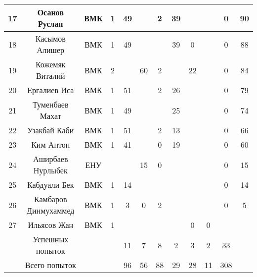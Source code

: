 \documentclass[10pt, a4paper]{article}
\begin{document}
\begin{center}
\begin{longtable}{|c|c|c|c|*{6}{c|}c|c|}
 \hline
17 & 	Осанов Руслан & 	ВМК & 1 & 	49 & 	  & 	2 & 	39 & 	  & 	  & 	0 & 	90 \\ 
 \hline
18 & 	Касымов Алишер & 	ВМК & 1 & 	49 & 	  & 	  & 	39 & 	0 & 	  & 	0 & 	88 \\ 
 \hline
19 & 	Кожемяк Виталий & 	ВМК & 2 & 	  & 	60 & 	2 & 	  & 	22 & 	  & 	0 & 	84 \\ 
 \hline
20 & 	Ергалиев Иса & 	ВМК &  1 &	51 & 	  & 	2 & 	26 & 	  & 	  & 	0 & 	79 \\ 
 \hline
21 & 	Туменбаев Махат & 	ВМК & 1 & 	49 & 	  & 	  & 	25 & 	  & 	  & 	0 & 	74 \\ 
 \hline
22 & 	Узакбай Каби & 	ВМК & 1 & 	51 & 	  & 	2 & 	13 & 	  & 	  & 	0 & 	66 \\ 
 \hline
23 & 	Ким Антон & 	ВМК & 1 & 	41 & 	  & 	0 & 	19 & 	  & 	  & 	0 & 	60 \\ 
 \hline
24 & 	Аширбаев Нурлыбек & ЕНУ  & 	 & 	  & 	15 & 	0 & 	  & 	  & 	  & 	0 & 	15 \\ 
 \hline
25 & 	Кабдуали Бек & 	ВМК & 1 & 	14 & 	  & 	  & 	  & 	  & 	  & 	0 & 	14 \\ 
 \hline
26 & 	Камбаров Динмухаммед & 	ВМК & 1 & 	3 & 	0 & 	2 & 	  & 	  & 	  & 	0 & 	5 \\ 
 \hline
27 & 	Ильясов Жан & 	ВМК & 1 & 	  & 	  & 	  & 	  & 	0 & 	0 & 	 & 	 \\ 
 \hline
 & 	Успешных попыток & 	&	& 11 & 	7 & 	8 & 	2 & 	3 & 	2 & 	33 & 	 \\ 
 \hline
 & 	Всего попыток & 	&	& 96 & 	56 & 	88 & 	29 & 	28 & 	11 & 	308 & 	 \\ 
 \hline
\end{longtable}
\end{center}
\end{document}

